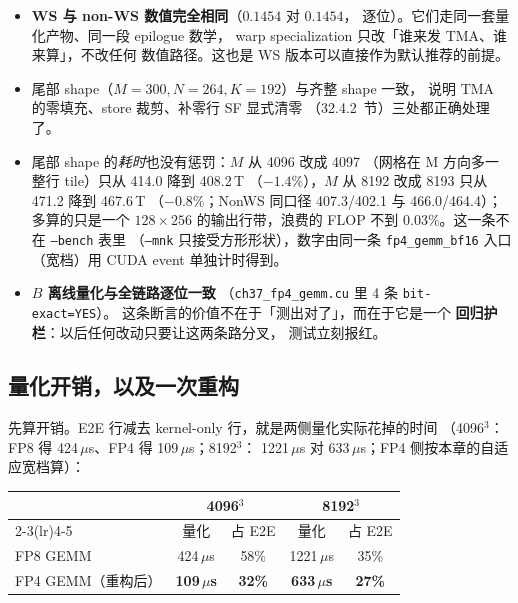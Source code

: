 \begin{itemize}[itemsep=2pt,topsep=3pt]
  \item \textbf{WS 与 non-WS 数值完全相同}（$0.1454$ 对 $0.1454$，
        逐位）。它们走同一套量化产物、同一段 epilogue 数学，
        warp specialization 只改「谁来发 TMA、谁来算」，不改任何
        数值路径。这也是 WS 版本可以直接作为默认推荐的前提。
  \item 尾部 shape（$M{=}300,N{=}264,K{=}192$）与齐整 shape 一致，
        说明 TMA 的零填充、store 裁剪、补零行 SF 显式清零
        （32.4.2~节）三处都正确处理了。
  \item 尾部 shape 的\emph{耗时}也没有惩罚：$M$ 从 4096 改成 4097
        （网格在 M 方向多一整行 tile）只从 414.0 降到 408.2\,T
        （$-1.4\%$），$M$ 从 8192 改成 8193 只从 471.2 降到 467.6\,T
        （$-0.8\%$；NonWS 同口径 407.3/402.1 与 466.0/464.4）；
        多算的只是一个 $128{\times}256$ 的输出行带，浪费的 FLOP
        不到 $0.03\%$。这一条不在 \texttt{--bench} 表里
        （\texttt{--mnk} 只接受方形形状），数字由同一条
        \texttt{fp4\_gemm\_bf16} 入口（宽档）用 CUDA event 单独计时得到。
  \item \textbf{$B$ 离线量化与全链路\textbf{逐位一致}}
        （\texttt{ch37\_fp4\_gemm.cu} 里 4 条 \texttt{bit-exact=YES}）。
        这条断言的价值不在于「测出对了」，而在于它是一个
        \textbf{回归护栏}：以后任何改动只要让这两条路分叉，
        测试立刻报红。
\end{itemize}

\subsection{量化开销，以及一次重构}

先算开销。E2E 行减去 kernel-only 行，就是两侧量化实际花掉的时间
（4096$^3$：FP8 得 424\,$\mu$s、FP4 得 109\,$\mu$s；8192$^3$：
1221\,$\mu$s 对 633\,$\mu$s；FP4 侧按本章的自适应宽档算）：

\begin{center}
\footnotesize
\begin{tabular}{lcccc}
\toprule
 & \multicolumn{2}{c}{4096$^3$} & \multicolumn{2}{c}{8192$^3$} \\
\cmidrule(lr){2-3}\cmidrule(lr){4-5}
 & 量化 & 占 E2E & 量化 & 占 E2E \\
\midrule
FP8 GEMM & 424\,$\mu$s & 58\% & 1221\,$\mu$s & 35\% \\
FP4 GEMM（重构后） & \textbf{109\,$\mu$s} & \textbf{32\%} &
  \textbf{633\,$\mu$s} & \textbf{27\%} \\
\bottomrule
\end{tabular}
\end{center}

